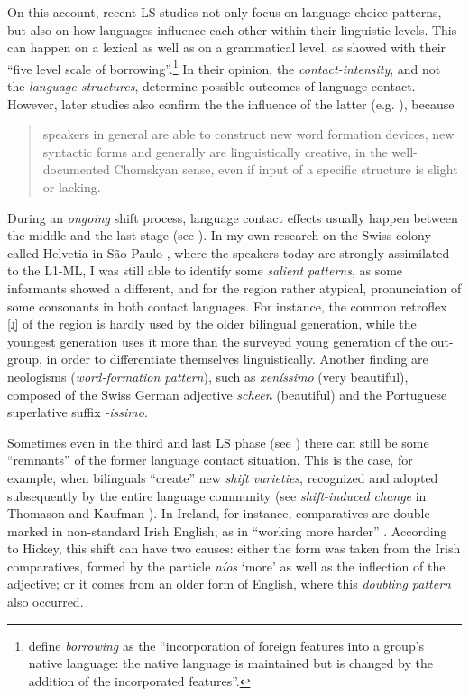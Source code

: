 \documentclass[output=paper]{langscibook}
\begin{document}
On this account, recent LS studies not only focus on language choice patterns, but also on how languages influence each other within their linguistic levels. This can happen on a lexical as well as on a grammatical level, as \textcite[35]{thomasonetal1988language} showed with their ``five level scale of borrowing''.\footnote{\textcite[37]{thomasonetal1988language} define \emph{borrowing} as the ``incorporation of foreign features into a group's native language: the native language is maintained but is changed by the addition of the incorporated features''.} In their opinion, the \emph{contact-intensity}, and not the \emph{language structures}, determine possible outcomes of language contact. However, later studies also confirm the the influence of the latter (e.g. \textcite{Treffers1999}), because

\begin{quote}
speakers in general are able to construct new word formation devices, new syntactic forms and generally are linguistically creative, in the well-doc\-u\-ment\-ed Chomskyan sense, even if input of a specific structure is slight or lacking. \parencite[591]{Gal2008}
\end{quote}

During an \emph{ongoing} shift process, language contact effects usually happen between the middle and the last stage (see ). In my own research on the Swiss colony called Helvetia in São Paulo \parencite{Karnopp}, where the speakers today are strongly assimilated to the L1-ML, I was still able to identify some \emph{salient patterns}, as some informants showed a different, and for the region rather atypical, pronunciation of  some consonants in both contact languages. For instance, the common retroflex [ɻ] of the region is hardly used by the older bilingual generation, while the youngest generation uses it more than the surveyed young generation of the out-group, in order to differentiate themselves linguistically. Another finding are neologisms (\emph{word-formation pattern}), such as \emph{xeníssimo} (very beautiful), composed of the Swiss German adjective \textit{scheen} (beautiful) and the Portuguese superlative suffix \textit{-issimo}.

Sometimes even in the third and last LS phase (see ) there can still be some ``remnants'' of the former language contact situation. This is the case, for example, when bilinguals ``create'' new \emph{shift varieties}, recognized and adopted subsequently by the entire language community (see \emph{shift-induced change} in Thomason and Kaufman \citeyear[38]{thomasonetal1988language}). In Ireland, for instance, comparatives are double marked in non-standard Irish English, as in ``working more harder'' \parencite[153]{Hickey2010}. According to Hickey, this shift can have two causes: either the form was taken from the Irish comparatives, formed by the particle \emph{níos} `more' as well as the inflection of the adjective; or it comes from an older form of English, where this \emph{doubling pattern} also occurred.
\end{document}
